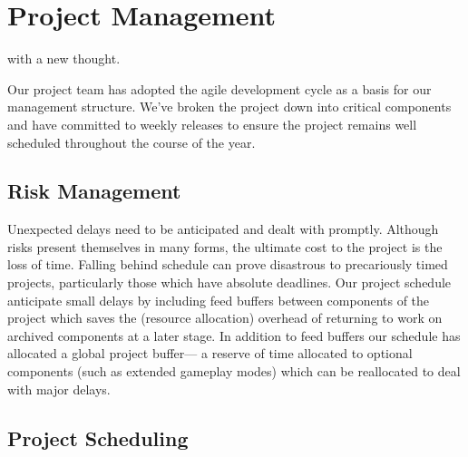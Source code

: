 \chapter[Project Management]{Project Management}
\label{ch:management}


 with a new thought.

Our project team has adopted the agile development cycle as a basis for our management structure. We've broken the project down into critical components and have committed to weekly releases to ensure the project remains well scheduled throughout the course of the year.

\section{Risk Management}
Unexpected delays need to be anticipated and dealt with promptly. Although risks present themselves in many forms, the ultimate cost to the project is the loss of time. Falling behind schedule can prove disastrous to precariously timed projects, particularly those which have absolute deadlines. Our project schedule anticipate small delays by including feed buffers between components of the project which saves the (resource allocation) overhead of returning to work on archived components at a later stage. In addition to feed buffers our schedule has allocated a global project buffer--- a reserve of time allocated to optional components (such as extended gameplay modes) which can be reallocated to deal with major delays.

\section{Project Scheduling}

